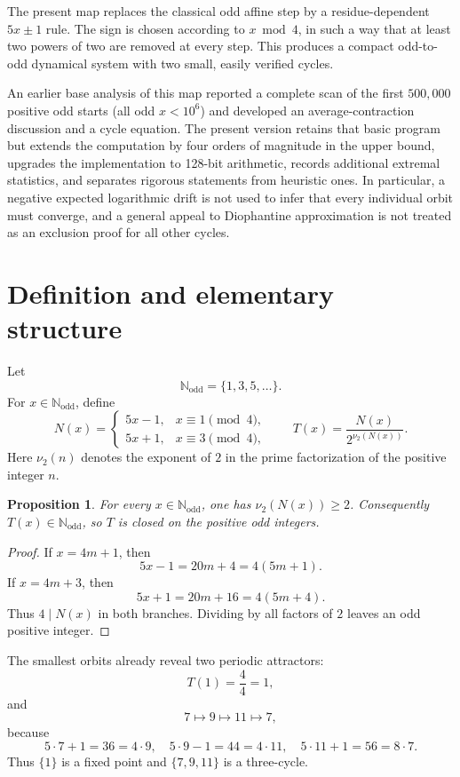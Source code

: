 \documentclass[11pt]{article}
\newtheorem{proposition}{Proposition}
\newcommand{\vTwo}{\nu_2}
\newcommand{\Odd}{\mathbb{N}_{\mathrm{odd}}}
\begin{document}
The present map replaces the classical odd affine step by a residue-dependent \(5x\pm1\) rule. The sign is chosen according to \(x\bmod4\), in such a way that at least two powers of two are removed at every step. This produces a compact odd-to-odd dynamical system with two small, easily verified cycles.

An earlier base analysis of this map reported a complete scan of the first \(500{,}000\) positive odd starts (all odd \(x<10^6\)) and developed an average-contraction discussion and a cycle equation. The present version retains that basic program but extends the computation by four orders of magnitude in the upper bound, upgrades the implementation to 128-bit arithmetic, records additional extremal statistics, and separates rigorous statements from heuristic ones. In particular, a negative expected logarithmic drift is not used to infer that every individual orbit must converge, and a general appeal to Diophantine approximation is not treated as an exclusion proof for all other cycles.

\section{Definition and elementary structure}

Let
\[
\Odd=\{1,3,5,\ldots\}.
\]
For \(x\in\Odd\), define
\begin{equation}
N(x)=
\begin{cases}
5x-1,&x\equiv1\pmod4,\\
5x+1,&x\equiv3\pmod4,
\end{cases}
\qquad
T(x)=\frac{N(x)}{2^{\vTwo(N(x))}}.
\label{eq:map}
\end{equation}
Here \(\vTwo(n)\) denotes the exponent of \(2\) in the prime factorization of the positive integer \(n\).

\begin{proposition}
For every \(x\in\Odd\), one has \(\vTwo(N(x))\ge2\). Consequently \(T(x)\in\Odd\), so \(T\) is closed on the positive odd integers.
\end{proposition}

\begin{proof}
If \(x=4m+1\), then
\[
5x-1=20m+4=4(5m+1).
\]
If \(x=4m+3\), then
\[
5x+1=20m+16=4(5m+4).
\]
Thus \(4\mid N(x)\) in both branches. Dividing by all factors of \(2\) leaves an odd positive integer.
\end{proof}

The smallest orbits already reveal two periodic attractors:
\[
T(1)=\frac{4}{4}=1,
\]
and
\[
7\longmapsto9\longmapsto11\longmapsto7,
\]
because
\[
5\cdot7+1=36=4\cdot9,\quad
5\cdot9-1=44=4\cdot11,\quad
5\cdot11+1=56=8\cdot7.
\]
Thus \(\{1\}\) is a fixed point and \(\{7,9,11\}\) is a three-cycle.
\end{document}
